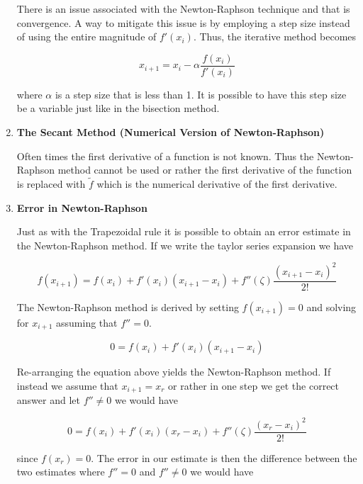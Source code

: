 \begin{enumerate}
There is an issue associated with the Newton-Raphson technique and
that is convergence. A way to mitigate this issue is by employing a
step size instead of using the entire magnitude of $f'(x_i)$. Thus,
the iterative method becomes

\begin{equation}
x_{i+1} = x_i - \alpha\frac{f(x_i)}{f'(x_i)}
\end{equation}

where $\alpha$ is a step size that is less than 1. It is possible to
have this step size be a variable just like in the bisection method.

\item{\bf The Secant Method (Numerical Version of Newton-Raphson)}

Often times the first derivative of a function is not known. Thus the
Newton-Raphson method cannot be used or rather the first derivative of
the function is replaced with $\tilde{f}$ which is the numerical
derivative of the first derivative.

\item{\bf Error in Newton-Raphson}

Just as with the Trapezoidal rule it is possible to obtain an error
estimate in the Newton-Raphson method. If we write the taylor series
expansion we have

\begin{equation}
f(x_{i+1}) = f(x_i) + f'(x_i)(x_{i+1}-x_i) + f''(\zeta)\frac{(x_{i+1}-x_i)^2}{2!}
\end{equation}

The Newton-Raphson method is derived by setting $f(x_{i+1}) = 0$ and
solving for $x_{i+1}$ assuming that $f'' = 0$.

\begin{equation}
0 = f(x_i) + f'(x_i)(x_{i+1}-x_i)
\end{equation}

Re-arranging the equation above yields the Newton-Raphson method. If
instead we assume that $x_{i+1} = x_r$ or rather in one step we get
the correct answer and let $f'' \neq 0$ we would have

\begin{equation}
0 = f(x_i) + f'(x_i)(x_r-x_i) + f''(\zeta)\frac{(x_r-x_i)^2}{2!}
\end{equation}

since $f(x_r) = 0$. The error in our estimate is then the difference
between the two estimates where $f''=0$ and $f''\neq 0$ we would have



\end{enumerate}

